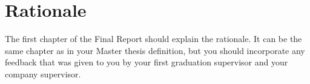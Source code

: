 \chapter{Rationale}\label{chap:rationale}
The first chapter of the Final Report should explain the rationale. It can be the same chapter as in your Master thesis definition, but you should incorporate any feedback that was given to you by your first graduation supervisor and your company supervisor.
